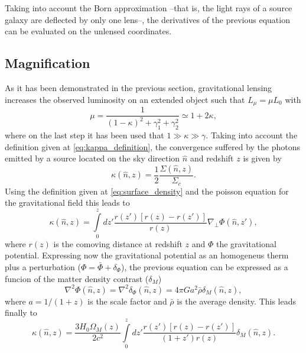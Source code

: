 Taking into account the Born approximation --that is, the light rays of a source galaxy are deflected by only one lens--, the derivatives of the previous equation can be evaluated on the unlensed coordinates.

\subsection{Magnification}
As it has been demonstrated in the previous section, gravitational lensing increases the observed luminosity on an extended object \cite{1989Sci...245..824B,1992RvMA....5..259B,1992LNP...406..345B,1995A&A...303..643B,1995AIPC..336..307B} such that $L_\mu = \mu L_0$ with 
\begin{equation}
\mu = \frac1{(1-\kappa)^2+\gamma_1^2+\gamma_2^2}\simeq 1+2\kappa,
\label{eq:mu_definition}
\end{equation}
where on the last step it has been used that $1\gg\kappa\gg\gamma$. Taking into account the definition given at \autoref{eq:kappa_definition}, the convergence suffered by the photons emitted by a source located on the sky direction $\hat n$ and redshift $z$ is given by
\begin{equation}
\kappa(\hat n,z) = \frac{1}{2}\frac{\Sigma(\hat n,z)}{\Sigma_c}.
\end{equation}
Using the definition given at \autoref{eq:surface_density} and the poisson equation for the gravitational field this leads to
\begin{equation}
\kappa(\hat n,z) = \int\limits_0^zdz'\frac{r(z')[r(z)-r(z')]}{r(z)}\nabla_\perp\Phi(\hat n,z'),
\label{eq:kappaphi}
\end{equation}
where $r(z)$ is the comoving distance at redshift $z$ and $\Phi$ the gravitational potential. Expressing now the gravitational potential as an homogeneus therm plus a perturbation ($\Phi = \bar\Phi+\delta_\Phi$), the previous equation can be expressed as a funcion of the matter density contrast ($\delta_M$)
\begin{equation}
\nabla^2\Phi(\hat n,z) = \nabla^2\delta_\Phi(\hat n,z) = 4\pi Ga^2\bar\rho\delta_M(\hat n,z),
\label{eq:kappadeltam}
\end{equation}
where $a=1/(1+z)$ is the scale factor and $\bar\rho$ is the average density. This leads finally to \cite{PhysRevD.76.103502,PhysRevD.77.063526}
\begin{equation}
\kappa(\hat n,z) = \frac{3H_0\Omega_M(z)}{2c^2}\int\limits_0^zdz'\frac{r(z')[r(z)-r(z')]}{(1+z')r(z)}\delta_M(\hat n,z).
\label{eq:kappadeltam}
\end{equation}
